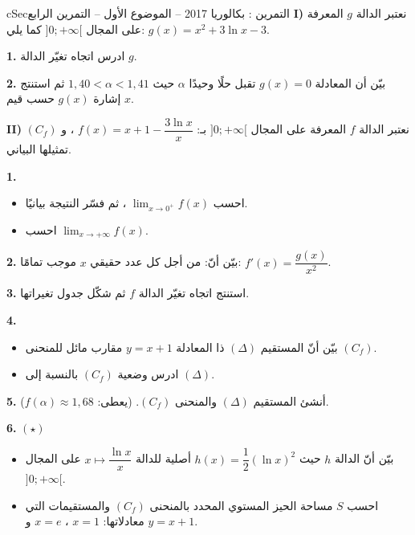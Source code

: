 \documentclass[12pt,a4paper]{article}
\newenvironment{BOX}[2]{\begin{otherlanguage}{english}\begin{arbox}{#1}{#2}}{\end{arbox}\end{otherlanguage}}
\newcounter{exo}
\newenvironment{tamrin}[1]{\stepcounter{exo}\begin{BOX}{cSec}{التمرين \theexo: #1}}{\end{BOX}}
\newenvironment{sq}{\begin{itemize}[leftmargin=2.4em,itemsep=3pt]}{\end{itemize}}
\newcommand{\qa}{\item[(أ)]}\newcommand{\qb}{\item[(ب)]}\newcommand{\qc}{\item[(جـ)]}\newcommand{\qd}{\item[(د)]}\newcommand{\qe}{\item[(هـ)]}
\newcommand{\QQ}[1]{\par\smallskip\textbf{#1.} }
\newcommand{\Lm}[1]{\displaystyle\lim_{x\to#1}}
\begin{document}
\begin{tamrin}{بكالوريا 2017 -- الموضوع الأول -- التمرين الرابع}
\textbf{I)} نعتبر الدالة $g$ المعرفة على المجال $]0;+\infty[$ كما يلي: $g(x)=x^2+3\ln x-3$.
\QQ{1} ادرس اتجاه تغيّر الدالة $g$.
\QQ{2} بيّن أن المعادلة $g(x)=0$ تقبل حلًا وحيدًا $\alpha$ حيث $1{,}40<\alpha<1{,}41$ ثم استنتج إشارة $g(x)$ حسب قيم $x$.\par
\textbf{II)} نعتبر الدالة $f$ المعرفة على المجال $]0;+\infty[$ بـ: $f(x)=x+1-\dfrac{3\ln x}x$ ، و $(C_f)$ تمثيلها البياني.
\QQ{1}
\begin{sq}
\qa احسب $\Lm{0^+}f(x)$ ، ثم فسّر النتيجة بيانيًا.
\qb احسب $\Lm{+\infty}f(x)$.
\end{sq}
\QQ{2} بيّن أنّ: من أجل كل عدد حقيقي $x$ موجب تمامًا: $f'(x)=\dfrac{g(x)}{x^2}$.
\QQ{3} استنتج اتجاه تغيّر الدالة $f$ ثم شكّل جدول تغيراتها.
\QQ{4}
\begin{sq}
\qa بيّن أنّ المستقيم $(\Delta)$ ذا المعادلة $y=x+1$ مقارب مائل للمنحنى $(C_f)$.
\qb ادرس وضعية $(C_f)$ بالنسبة إلى $(\Delta)$.
\end{sq}
\QQ{5} أنشئ المستقيم $(\Delta)$ والمنحنى $(C_f)$. (يعطى: $f(\alpha)\approx1{,}68$).
\QQ{6} $(\star)$
\begin{sq}
\qa بيّن أنّ الدالة $h$ حيث $h(x)=\dfrac12(\ln x)^2$ أصلية للدالة $x\mapsto\dfrac{\ln x}x$ على المجال $]0;+\infty[$.
\qb احسب $S$ مساحة الحيز المستوي المحدد بالمنحنى $(C_f)$ والمستقيمات التي معادلاتها: $x=1$ ، $x=e$ و $y=x+1$.
\end{sq}
\end{tamrin}
\end{document}

